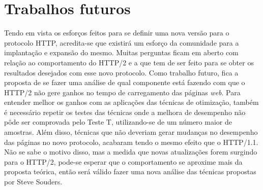 \section{Trabalhos futuros}
\label{trabalhosfuturos}

Tendo em vista os esforços feitos para se definir uma nova versão para o protocolo HTTP, acredita-se que existirá um esforço da comunidade para a implantação e expansão do mesmo. Muitas perguntas ficam em aberto com relação ao comportamento do HTTP/2 e a que tem de ser feito para se obter os resultados desejados com esse novo protocolo. Como trabalho futuro, fica a proposta de se fazer uma análise de qual componente está fazendo com que o HTTP/2 não gere ganhos no tempo de carregamento das páginas \textit{web}. Para entender melhor os ganhos com as aplicações das técnicas de otimização, também é necessário repetir os testes das técnicas onde a melhora de desempenho não pôde ser comprovada pelo Teste T, utilizando-se de um número maior de amostras. Além disso, técnicas que não deveriam gerar mudanças no desempenho das páginas no novo protocolo, acabaram tendo o mesmo efeito que o HTTP/1.1. Não se sabe o motivo disso, mas a medida que novas atualizações forem surgindo para o HTTP/2, pode-se esperar que o comportamento se aproxime mais da proposta teórica, então será válido fazer uma nova análise das técnicas propostas por Steve Souders.
